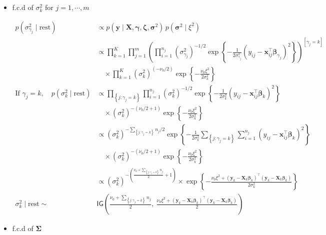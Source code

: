 \begin{appendix}
\begin{itemize}
\newpage

\item f.c.d of $\sigma_k^2$ for $j=1,\cdots,m$

\begin{equation}
\begin{split}
p(\sigma_{\gamma_j}^2 \mid \text{rest}) 
&\propto p(\bm{y} \mid \bm{X}, \bm{\gamma}, \bm{\zeta}, \bm{\sigma}^2)
\, p(\bm{\sigma}^2 \mid \xi^2)  \\
&\propto \prod_{k=1}^{K}\prod_{j=1}^{m} \left(\prod_{i=1}^{n_j} (\sigma_{\gamma_j}^2)^{-1/2} 
\exp\left\{ -\frac{1}{2\sigma_{\gamma_j}^2} (y_{ij} - \bm{x}_{ij}^\top \bm{\beta}_{\gamma_j})^2 \right\} \right)^{[\gamma_j = k]}\\ 
&\quad \times \prod_{k=1}^{K} (\sigma_k^2)^{(-\nu_0/2)} 
\exp\left\{ -\frac{\nu_0 \xi^2}{2\sigma_k^2} \right\} \\
\text{If } \gamma_j = k,\quad 
p(\sigma_k^2 \mid \text{rest}) 
&\propto \prod_{\left\lbrace j : \gamma_j = k\right\rbrace} \prod_{i=1}^{n_j} (\sigma_k^2)^{-1/2} 
\exp\left\{ -\frac{1}{2\sigma_k^2} (y_{ij} - \bm{x}_{ij}^\top \bm{\beta}_k)^2 \right\} \\
&\quad \times (\sigma_k^2)^{-(\nu_0 / 2 + 1)} 
\exp\left\{ -\frac{\nu_0 \xi^2}{2\sigma_k^2} \right\} \\
&\propto  (\sigma_k^2)^{-\sum_{\left\lbrace j : \gamma_j = k\right\rbrace}n_j/2} 
\exp\left\{ -\frac{1}{2\sigma_k^2} 
\sum_{\left\lbrace j : \gamma_j = k\right\rbrace}\sum_{i=1}^{n_j} (y_{ij} - \bm{x}_{ij}^\top \bm{\beta}_k)^2 \right\}\\
&\quad \times (\sigma_k^2)^{-(\nu_0 / 2 + 1)} 
\exp\left\{ -\frac{\nu_0 \xi^2}{2\sigma_k^2} \right\}\\
&\propto (\sigma_k^2)^{-\left( \frac{\nu_0+\sum_{\left\lbrace j : \gamma_j = k\right\rbrace}n_j}{2} + 1 \right)} 
\times \exp\left\{ -\frac{ \nu_0 \xi^2 +  (\bm{y}_{k} - \bm{X}_{k} \bm{\beta}_k)^\top(\bm{y}_{k} - \bm{X}_{k} \bm{\beta}_k) }{2\sigma_k^2} \right\}\\
\sigma_k^2 \mid \text{rest} \sim&\mathsf{IG} \left( 
\frac{\nu_0 + \sum_{\left\lbrace j : \gamma_j = k\right\rbrace}n_j}{2},\ 
\frac{ \nu_0 \xi^2 + (\bm{y}_{k} - \bm{X}_{k} \bm{\beta}_k)^\top(\bm{y}_{k} - \bm{X}_{k} \bm{\beta}_k) }{2} 
\right)
\end{split}
\end{equation}

\item f.c.d of $\bm{\Sigma}$


\end{itemize}
\end{appendix}
